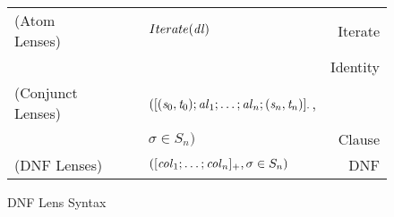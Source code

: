\begin{figure}
\centering
\begin{tabular}{l@{\ }l@{\ }c@{\ }l@{\ }r}
(Atom Lenses) &\AtomLens{} & \GEq{} & $Iterate(\mathit{dl})$ & Iterate\\
& & & \GBar{} \IdentityLens{} & Identity\\
(Conjunct Lenses) &\ConjunctLens{} & \GEq{} &
$([(\mathit{s}_0,\mathit{t}_0);\mathit{al}_1;\ldots;\mathit{al}_n;(\mathit{s}_n,\mathit{t}_n)]_{\cdot}$, &\\
& & & $\sigma \in S_n)$ & Clause\SubN{}\\
(DNF Lenses)& \DNFLens{} & \GEq{} & $([\mathit{col}_1;\ldots;\mathit{col}_n]_{+}, \sigma \in S_n)$ & DNF\SubN{}\\
\end{tabular}
\caption{DNF Lens Syntax}
\label{fig:dnf-lens-syntax}
\end{figure}
